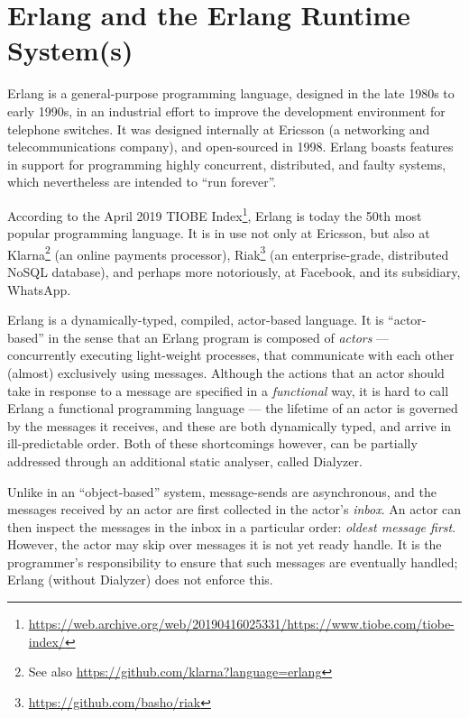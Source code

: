 \chapter{Erlang and the Erlang Runtime System(s)}

Erlang is a general-purpose programming language, designed in the late
1980s to early 1990s, in an industrial effort to improve the
development environment for telephone switches\cite{erlang:hopl:2007}.
It was designed internally at Ericsson (a networking and
telecommunications company), and open-sourced in 1998. Erlang boasts
features in support for programming highly concurrent, distributed,
and faulty systems, which nevertheless are intended to ``run
forever''.

According to the April 2019 TIOBE
Index\footnote{\url{https://web.archive.org/web/20190416025331/https://www.tiobe.com/tiobe-index/}},
Erlang is today the 50th most popular programming language. It is in
use not only at Ericsson\cite{media:2018-03-31:Erlang-20-years}, but
also at
Klarna\cite{media:2015-01-09:Klarna-Engineering-Insights}\footnote{See
also \url{https://github.com/klarna?language=erlang}} (an online
payments processor),
Riak\footnote{\url{https://github.com/basho/riak}} (an
enterprise-grade, distributed NoSQL database), and perhaps more
notoriously, at Facebook\cite{media:2008-03-13:facebook-chat}, and its
subsidiary, WhatsApp\cite{media:2014-02-21:Inside-Erlang}.

Erlang is a dynamically-typed, compiled, actor-based
language\cite{erlang:2019:Erlang-OTP}. It is ``actor-based'' in the
sense that an Erlang program is composed of \emph{actors} ---
concurrently executing light-weight processes, that communicate with
each other (almost) exclusively using messages.  Although the actions
that an actor should take in response to a message are specified in a
\emph{functional} way, it is hard to call Erlang a functional
programming language --- the lifetime of an actor is governed by the
messages it receives, and these are both dynamically typed, and arrive
in ill-predictable order. Both of these shortcomings however, can be
partially addressed through an additional static analyser, called
Dialyzer\cite{erlang:2019:Dialyzer}.

Unlike in an ``object-based'' system, message-sends are asynchronous,
and the messages received by an actor are first collected in the
actor's \emph{inbox}. An actor can then inspect the messages in the
inbox in a particular order: \emph{oldest message first}.  However,
the actor may skip over messages it is not yet ready handle.  It is
the programmer's responsibility to ensure that such messages are
eventually handled; Erlang (without Dialyzer) does not enforce this.

